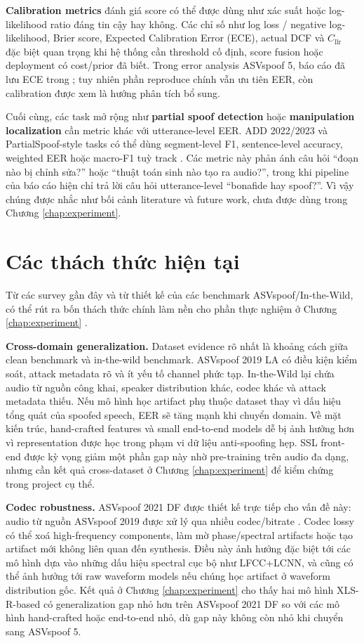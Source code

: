\textbf{Calibration metrics} đánh giá score có thể được dùng như xác suất hoặc log-likelihood ratio đáng tin cậy hay không. Các chỉ số như log loss / negative log-likelihood, Brier score, Expected Calibration Error (ECE), actual DCF và $C_{\mathrm{llr}}$ đặc biệt quan trọng khi hệ thống cần threshold cố định, score fusion hoặc deployment có cost/prior đã biết. Trong error analysis ASVspoof 5, báo cáo đã lưu ECE trong ; tuy nhiên phần reproduce chính vẫn ưu tiên EER, còn calibration được xem là hướng phân tích bổ sung.

Cuối cùng, các task mở rộng như \textbf{partial spoof detection} hoặc \textbf{manipulation localization} cần metric khác với utterance-level EER. ADD 2022/2023 và PartialSpoof-style tasks có thể dùng segment-level F1, sentence-level accuracy, weighted EER hoặc macro-F1 tuỳ track \cite{add2022,add2023,partialspoof}. Các metric này phản ánh câu hỏi ``đoạn nào bị chỉnh sửa?'' hoặc ``thuật toán sinh nào tạo ra audio?'', trong khi pipeline của báo cáo hiện chỉ trả lời câu hỏi utterance-level ``bonafide hay spoof?''. Vì vậy chúng được nhắc như bối cảnh literature và future work, chưa được dùng trong Chương \ref{chap:experiment}.

\section{Các thách thức hiện tại}

Từ các survey gần đây và từ thiết kế của các benchmark ASVspoof/In-the-Wild, có thể rút ra bốn thách thức chính làm nền cho phần thực nghiệm ở Chương \ref{chap:experiment} \cite{asvspoof5_arxiv2024,in_the_wild,sdd_survey}.

\textbf{Cross-domain generalization.} Dataset evidence rõ nhất là khoảng cách giữa clean benchmark và in-the-wild benchmark. ASVspoof 2019 LA có điều kiện kiểm soát, attack metadata rõ và ít yếu tố channel phức tạp. In-the-Wild lại chứa audio từ nguồn công khai, speaker distribution khác, codec khác và attack metadata thiếu. Nếu mô hình học artifact phụ thuộc dataset thay vì dấu hiệu tổng quát của spoofed speech, EER sẽ tăng mạnh khi chuyển domain. Về mặt kiến trúc, hand-crafted features và small end-to-end models dễ bị ảnh hưởng hơn vì representation được học trong phạm vi dữ liệu anti-spoofing hẹp. SSL front-end được kỳ vọng giảm một phần gap này nhờ pre-training trên audio đa dạng, nhưng cần kết quả cross-dataset ở Chương \ref{chap:experiment} để kiểm chứng trong project cụ thể.

\textbf{Codec robustness.} ASVspoof 2021 DF được thiết kế trực tiếp cho vấn đề này: audio từ nguồn ASVspoof 2019 được xử lý qua nhiều codec/bitrate \cite{asvspoof2021}. Codec lossy có thể xoá high-frequency components, làm mờ phase/spectral artifacts hoặc tạo artifact mới không liên quan đến synthesis. Điều này ảnh hưởng đặc biệt tới các mô hình dựa vào những dấu hiệu spectral cục bộ như LFCC+LCNN, và cũng có thể ảnh hưởng tới raw waveform models nếu chúng học artifact ở waveform distribution gốc. Kết quả ở Chương \ref{chap:experiment} cho thấy hai mô hình XLS-R-based có generalization gap nhỏ hơn trên ASVspoof 2021 DF so với các mô hình hand-crafted hoặc end-to-end nhỏ, dù gap này không còn nhỏ khi chuyển sang ASVspoof 5.

